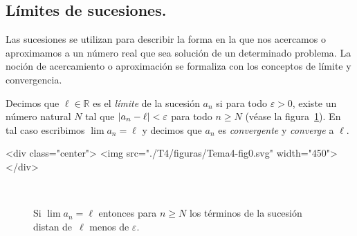 \subsection{Límites de sucesiones.}

Las sucesiones se utilizan para describir la forma en la que nos acercamos o aproximamos a un número real que sea solución de un determinado problema.
La noción de acercamiento o aproximación se formaliza con los conceptos de límite y convergencia.

\begin{definicion} 
Decimos que $\ell\in\mathbb{R}$ es el \emph{límite} de la sucesión $a_n$ si para todo $\varepsilon > 0$, existe un número natural $N$ tal que $|a_n-\ell|< \varepsilon$ para todo $n\geq  N$
(véase la figura~\ref{06limsuc1}). En tal caso escribimos $\lim a_n=%
\ell$ y decimos que $a_n$ es \emph{convergente} y {\em converge} a $\ell$.
\begin{rawhtml}
<div class="center">
<img src="./T4/figuras/Tema4-fig0.svg" width="450">
</div>
\end{rawhtml}
\end{definicion}
%
\begin{latexonly}
\begin{figure}
\begin{center}
\\[-3em]\rule{0pt}{0pt}
\end{center}
\caption{Si $\lim a_n=\ell$ entonces para $n\geq N$ los términos de la sucesión distan de~$\ell$ menos de $\varepsilon$.}\label{06limsuc1}
\end{figure}
\end{latexonly}

